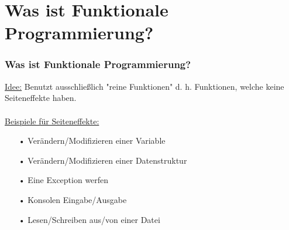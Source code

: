 	\section[Section]{Was ist Funktionale Programmierung?}
		\begin{frame}
			\frametitle{Was ist Funktionale Programmierung?}
				\underline{Idee:}
				Benutzt ausschließlich "reine Funktionen" d. h. Funktionen, welche 					keine Seiteneffekte haben. \\
				\leavevmode \\
				\underline{Beispiele für Seiteneffekte:}
				\begin{itemize}
				\item[•] Verändern/Modifizieren einer Variable
				\item[•] Verändern/Modifizieren einer Datenstruktur
				\item[•] Eine Exception werfen
				\item[•] Konsolen Eingabe/Ausgabe
				\item[•] Lesen/Schreiben aus/von einer Datei
				\end{itemize}
		\end{frame}